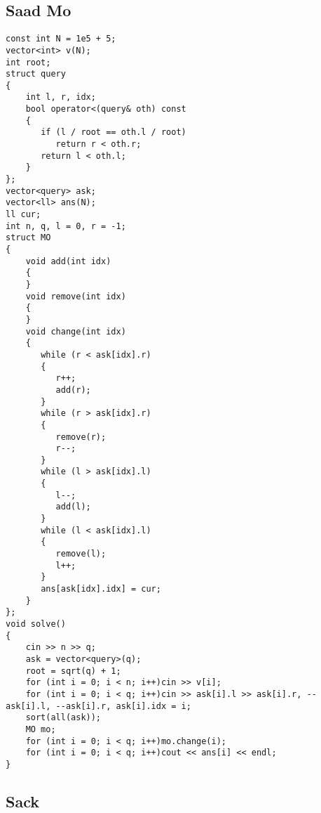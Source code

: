 \subsection{Saad Mo}

\begin{lstlisting}[style=cpp]
const int N = 1e5 + 5;  
vector<int> v(N);  
int root;  
struct query  
{  
    int l, r, idx;  
    bool operator<(query& oth) const  
    {  
       if (l / root == oth.l / root)  
          return r < oth.r;  
       return l < oth.l;  
    }  
};  
vector<query> ask;  
vector<ll> ans(N);  
ll cur;  
int n, q, l = 0, r = -1;  
struct MO  
{  
    void add(int idx)  
    {  
    }  
    void remove(int idx)  
    {  
    }  
    void change(int idx)  
    {  
       while (r < ask[idx].r)  
       {  
          r++;  
          add(r);  
       }  
       while (r > ask[idx].r)  
       {  
          remove(r);  
          r--;  
       }  
       while (l > ask[idx].l)  
       {  
          l--;  
          add(l);  
       }  
       while (l < ask[idx].l)  
       {  
          remove(l);  
          l++;  
       }  
       ans[ask[idx].idx] = cur;  
    }  
};  
void solve()  
{  
    cin >> n >> q;  
    ask = vector<query>(q);  
    root = sqrt(q) + 1;  
    for (int i = 0; i < n; i++)cin >> v[i];  
    for (int i = 0; i < q; i++)cin >> ask[i].l >> ask[i].r, --ask[i].l, --ask[i].r, ask[i].idx = i;  
    sort(all(ask));  
    MO mo;  
    for (int i = 0; i < q; i++)mo.change(i);  
    for (int i = 0; i < q; i++)cout << ans[i] << endl;  
}
\end{lstlisting}

\subsection{Sack}

